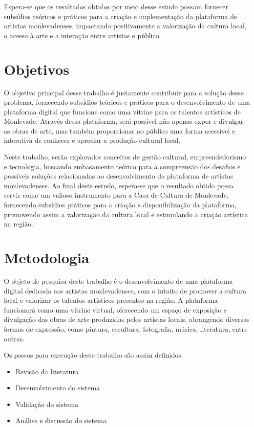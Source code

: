 Espera-se que os resultados obtidos por meio desse estudo possam fornecer subsídios teóricos e práticos para a criação e implementação da plataforma de artistas monlevadenses, impactando positivamente a valorização da cultura local, o acesso à arte e a interação entre artistas e público.

\section{Objetivos}
\label{sec:objetivos}


O objetivo principal desse trabalho é justamente contribuir para a solução desse problema, fornecendo subsídios teóricos e práticos para o desenvolvimento de uma plataforma digital que funcione como uma vitrine para os talentos artísticos de Monlevade. Através dessa plataforma, será possível não apenas expor e divulgar as obras de arte, mas também proporcionar ao público uma forma acessível e interativa de conhecer e apreciar a produção cultural local.

Neste trabalho, serão explorados conceitos de gestão cultural, empreendedorismo e tecnologia, buscando embasamento teórico para a compreensão dos desafios e possíveis soluções relacionadas ao desenvolvimento da plataforma de artistas monlevadenses. Ao final deste estudo, espera-se que o resultado obtido possa servir como um valioso instrumento para a Casa de Cultura de Monlevade, fornecendo subsídios práticos para a criação e disponibilização da plataforma, promovendo assim a valorização da cultura local e estimulando a criação artística na região.

\section{Metodologia}
\label{sec:metodologia}

O objeto de pesquisa deste trabalho é o desenvolvimento de uma plataforma digital dedicada aos artistas monlevadenses, com o intuito de promover a cultura local e valorizar os talentos artísticos presentes na região. A plataforma funcionará como uma vitrine virtual, oferecendo um espaço de exposição e divulgação das obras de arte produzidas pelos artistas locais, abrangendo diversas formas de expressão, como pintura, escultura, fotografia, música, literatura, entre outras.

Os passos para execução deste trabalho são assim definidos:

\begin{itemize}
	\item Revisão da literatura
	\item Desenvolvimento do sistema
	\item Validação do sistema
	\item Análise e discussão do sistema
\end{itemize}

